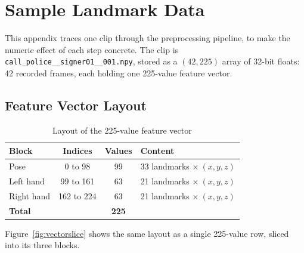 \chapter{Sample Landmark Data}
\label{app:sampledata}

This appendix traces one clip through the preprocessing pipeline, to make the numeric effect of each step concrete. The clip is \texttt{call\_police\_\_signer01\_\_001.npy}, stored as a $(42, 225)$ array of 32-bit floats: 42 recorded frames, each holding one 225-value feature vector.

\section{Feature Vector Layout}

\begin{table}[htbp]
    \centering
    \caption{Layout of the 225-value feature vector}
    \label{tab:featurelayout}
    \begin{tabular}{lccl}
        \toprule
        \textbf{Block} & \textbf{Indices} & \textbf{Values} & \textbf{Content} \\
        \midrule
        Pose        & 0 to 98    & 99 & 33 landmarks $\times\ (x, y, z)$ \\
        Left hand   & 99 to 161  & 63 & 21 landmarks $\times\ (x, y, z)$ \\
        Right hand  & 162 to 224 & 63 & 21 landmarks $\times\ (x, y, z)$ \\
        \midrule
        \textbf{Total} & & \textbf{225} & \\
        \bottomrule
    \end{tabular}
\end{table}

\noindent Figure~\ref{fig:vectorslice} shows the same layout as a single 225-value row, sliced into its three blocks.

